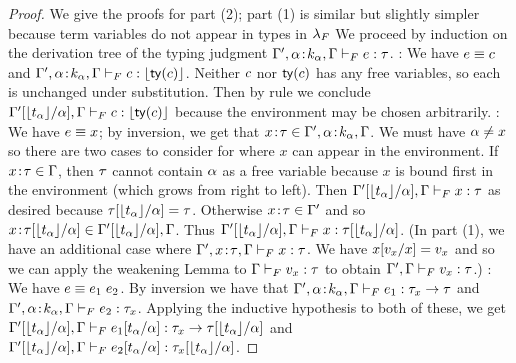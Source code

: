 \begin{proof}
We give the proofs for part (2); part (1) is similar but slightly
simpler because term variables do not appear in types in $\sysf$
We proceed by induction on the derivation tree of the typing judgment
$\hasftype{\tcenv', \bind{\al}{k_{\al}}, \tcenv}{\sexpr}{\sftype}$.
\pfcase{\fPrim}: We have $\sexpr \equiv \sconst$ and
$\hasftype{\tcenv', \bind{\al}{k_{\al}}, \tcenv}{\sconst}{\forgetreft{\ty{\sconst}}}$.
Neither $\sconst$ nor $\ty{\sconst}$ has any free variables, so each is 
unchanged under substitution. Then by rule \tPrim we conclude
$\hasftype{\subst{\tcenv'}{\al}{\forgetreft{\stype_{\al}}}, \tcenv}{\sconst}{\forgetreft{\ty{\sconst}}}$ because the environment may be chosen arbitrarily.
\pfcase{\fVar}: We have $\sexpr \equiv x$; by inversion, we get that 
$\bind{x}{\sftype} \in \tcenv', \bind{\al}{k_{\al}}, \tcenv$. We must have
$\tvar \neq x$ so there are two cases to consider for where $x$ can 
appear in the environment. If $\bind{x}{\sftype} \in \tcenv$,  then $\sftype$
cannot contain $\tvar$ as a free variable because $x$ is bound first in the environment (which grows from right to left). Then
$\hasftype{\subst{\tcenv'}{\al}{\forgetreft{\stype_{\al}}}, \tcenv}{x}{\sftype}$
as desired because $\subst{\sftype}{\tvar}{\forgetreft{\stype_{\al}}} = \sftype$.
Otherwise $\bind{x}{\sftype} \in \tcenv'$ and so 
$\bind{x}{\subst{\sftype}{\tvar}{\forgetreft{\stype_{\al}}}} \in \subst{\tcenv'}{\al}{\forgetreft{\stype_{\al}}}, \tcenv$. Thus
$\hasftype{\subst{\tcenv'}{\al}{\forgetreft{\stype_{\al}}}, \tcenv}{x}{\subst{\sftype}{\tvar}{\forgetreft{\stype_{\al}}}}$.
%
(In part (1), we have an additional case where 
$\hasftype{\tcenv', \bind{x}{\sftype}, \tcenv}{x}{\sftype}$. We have
$\subst{x}{x}{\sval_x} = \sval_x$ and so we can apply the weakening Lemma
to $\hasftype{\tcenv}{\sval_x}{\sftype}$ to obtain
$\hasftype{\tcenv', \tcenv}{\sval_x}{\sftype}$.)
\pfcase{\fApp}: We have $\sexpr \equiv \app{\sexpr_1}{\sexpr_2}$. By inversion
we have that
$\hasftype{\tcenv', \bind{\al}{k_{\al}}, \tcenv}{\sexpr_1}{\funcftype{\sftype_x}{\sftype}}$
and $\hasftype{\tcenv', \bind{\al}{k_{\al}}, \tcenv}{\sexpr_2}{\sftype_x}$.
Applying the inductive hypothesis to both of these, we get
$\hasftype{\subst{\tcenv'}{\al}{\forgetreft{\stype_{\al}}}, \tcenv}{\subst{\sexpr_1}{\tvar}{\stype_{\tvar}}}{\subst{\funcftype{\sftype_x}{\sftype}}{\tvar}{\forgetreft{\stype_{\tvar}}}}$
and
$\hasftype{\subst{\tcenv'}{\al}{\forgetreft{\stype_{\al}}}, \tcenv}{\subst{\sexpr_2}{\tvar}{\stype_{\tvar}}}{\subst{\sftype_x}{\tvar}{\forgetreft{\stype_{\tvar}}}}$. 

\end{proof}
